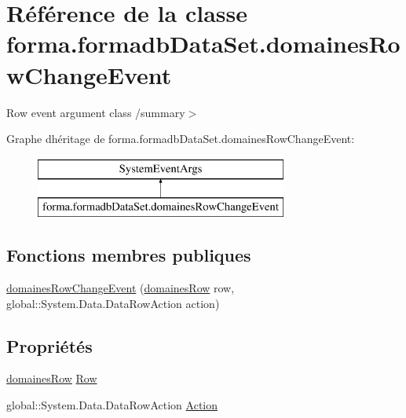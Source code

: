 \hypertarget{classforma_1_1formadb_data_set_1_1domaines_row_change_event}{}\section{Référence de la classe forma.\+formadb\+Data\+Set.\+domaines\+Row\+Change\+Event}
\label{classforma_1_1formadb_data_set_1_1domaines_row_change_event}


Row event argument class /summary$>$  


Graphe d\textquotesingle{}héritage de forma.\+formadb\+Data\+Set.\+domaines\+Row\+Change\+Event\+:\begin{figure}[H]
\begin{center}
\leavevmode
\includegraphics[height=2.000000cm]{classforma_1_1formadb_data_set_1_1domaines_row_change_event}
\end{center}
\end{figure}
\subsection*{Fonctions membres publiques}
\begin{DoxyCompactItemize}
\item 
\hyperlink{classforma_1_1formadb_data_set_1_1domaines_row_change_event_a157c966911acc4642e432bbc22b181ca}{domaines\+Row\+Change\+Event} (\hyperlink{classforma_1_1formadb_data_set_1_1domaines_row}{domaines\+Row} row, global\+::\+System.\+Data.\+Data\+Row\+Action action)
\end{DoxyCompactItemize}
\subsection*{Propriétés}
\begin{DoxyCompactItemize}
\item 
\hyperlink{classforma_1_1formadb_data_set_1_1domaines_row}{domaines\+Row} \hyperlink{classforma_1_1formadb_data_set_1_1domaines_row_change_event_ac94213c15c74286ebe675a5594d23e00}{Row}
\item 
global\+::\+System.\+Data.\+Data\+Row\+Action \hyperlink{classforma_1_1formadb_data_set_1_1domaines_row_change_event_abc2bec70ce04a769a38422f70f8dc83f}{Action}
\end{DoxyCompactItemize}


